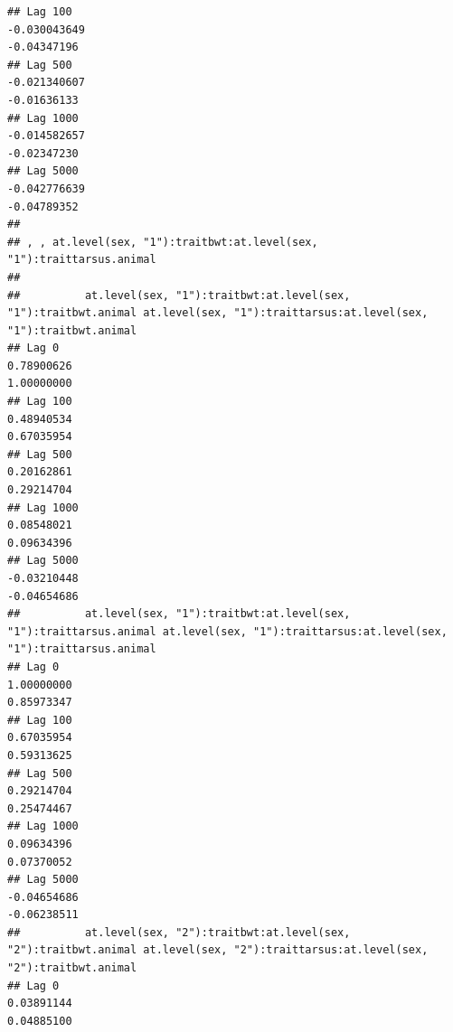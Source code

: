\documentclass[
  12pt,
]{book}
\begin{document}
\begin{verbatim}
## Lag 100                                                      -0.030043649                                                         -0.04347196
## Lag 500                                                      -0.021340607                                                         -0.01636133
## Lag 1000                                                     -0.014582657                                                         -0.02347230
## Lag 5000                                                     -0.042776639                                                         -0.04789352
## 
## , , at.level(sex, "1"):traitbwt:at.level(sex, "1"):traittarsus.animal
## 
##          at.level(sex, "1"):traitbwt:at.level(sex, "1"):traitbwt.animal at.level(sex, "1"):traittarsus:at.level(sex, "1"):traitbwt.animal
## Lag 0                                                        0.78900626                                                        1.00000000
## Lag 100                                                      0.48940534                                                        0.67035954
## Lag 500                                                      0.20162861                                                        0.29214704
## Lag 1000                                                     0.08548021                                                        0.09634396
## Lag 5000                                                    -0.03210448                                                       -0.04654686
##          at.level(sex, "1"):traitbwt:at.level(sex, "1"):traittarsus.animal at.level(sex, "1"):traittarsus:at.level(sex, "1"):traittarsus.animal
## Lag 0                                                           1.00000000                                                           0.85973347
## Lag 100                                                         0.67035954                                                           0.59313625
## Lag 500                                                         0.29214704                                                           0.25474467
## Lag 1000                                                        0.09634396                                                           0.07370052
## Lag 5000                                                       -0.04654686                                                          -0.06238511
##          at.level(sex, "2"):traitbwt:at.level(sex, "2"):traitbwt.animal at.level(sex, "2"):traittarsus:at.level(sex, "2"):traitbwt.animal
## Lag 0                                                        0.03891144                                                        0.04885100

\end{verbatim}
\end{document}
